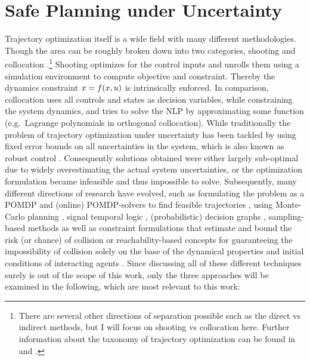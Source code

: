 \section{Safe Planning under Uncertainty}
\label{text:related/uncertainty}
Trajectory optimization itself is a wide field with many different methodologies. Though the area can be roughly broken down into two categories, shooting and collocation \cite{Kelly2017}.\footnote{There are several other directions of separation possible such as the direct vs indirect methods, but I will focus on shooting vs collocation here. Further information about the taxonomy of trajectory optimization can be found in \cite{Kelly2017} and \cite{Chai2020}.} Shooting optimizes for the control inputs and unrolls them using a simulation environment to compute objective and constraint. Thereby the dynamics constraint $x = f(x, u)$ is intrinsically enforced. In comparison, collocation uses all controls and states as decision variables, while constraining the system dynamics, and tries to solve the \ac{NLP} by approximating some function (e.g.\ Lagrange polynomials in orthogonal collocation).
\newline
While traditionally the problem of trajectory optimization under uncertainty has been tackled by using fixed error bounds on all uncertainties in the system, which is also known as robust control \cite{Bemporad1999}. Consequently solutions obtained were either largely sub-optimal due to widely overestimating the actual system uncertainties, or the optimization formulation became infeasible and thus impossible to solve. Subsequently, many different directions of research have evolved, such as formulating the problem as a \ac{POMDP} and (online) \ac{POMDP}-solvers to find feasible trajectories \cite{Chen2016}, using Monte-Carlo planning \cite{Janson2015} \cite{Silver2010}, signal temporal logic \cite{Sadigh2016}, (probabilistic) decision graphs \cite{Koenig1994}, sampling-based methods as well as constraint formulations that estimate and bound the risk (or chance) of collision \cite{Ono2015}\cite{Lew2019}\cite{Chow2015a}\cite{Chow2015}\cite{Ono2012}\cite{Ludersa}\cite{Luders2011}\cite{Otte2014} or reachability-based concepts for guaranteeing the impossibility of collision solely on the base of the dynamical properties and initial conditions of interacting agents \cite{Leung2020}\cite{Dhinakaran2017}\cite{Margellos2009}\cite{Chen2017b} \cite{Althoff2009}\cite{Althoff2010}. Since discussing all of these different techniques surely is out of the scope of this work, only the three approaches will be examined in the following, which are most relevant to this work:

